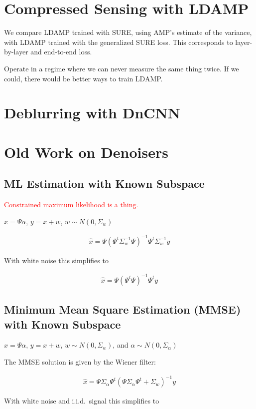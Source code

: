 \documentclass{article}
\begin{document}
\section{Compressed Sensing with LDAMP}
We compare LDAMP trained with SURE, using AMP's estimate of the variance, with LDAMP trained with the generalized SURE loss.
This corresponds to layer-by-layer and end-to-end loss.

Operate in a regime where we can never measure the same thing twice. If we could, there would be better ways to train LDAMP.

\section{Deblurring with DnCNN}
\newpage
\section{Old Work on Denoisers}
\subsection{ML Estimation with Known Subspace}
\textcolor{red}{Constrained maximum likelihood is a thing.}

$x=\Psi\alpha$, $y=x+w$, $w\sim N(0,\Sigma_w)$ 


\begin{align}
    \hat{x}=\Psi(\Psi^t\Sigma_w^{-1}\Psi)^{-1}\Psi^t\Sigma_w^{-1}y
\end{align}

With white noise this simplifies to 

\begin{align}
    \hat{x}=\Psi(\Psi^t\Psi)^{-1}\Psi^ty
\end{align}

\subsection{ Minimum Mean Square Estimation (MMSE) with Known Subspace}
$x=\Psi\alpha$, $y=x+w$, $w\sim N(0,\Sigma_w)$, and $\alpha\sim N(0,\Sigma_\alpha)$


The MMSE solution is given by the Wiener filter:

\begin{align}
    \hat{x}=\Psi \Sigma_\alpha\Psi^t (\Psi\Sigma_\alpha\Psi^t+\Sigma_w)^{-1} y
\end{align}

With white noise and i.i.d.~signal this simplifies to 
\end{document}
